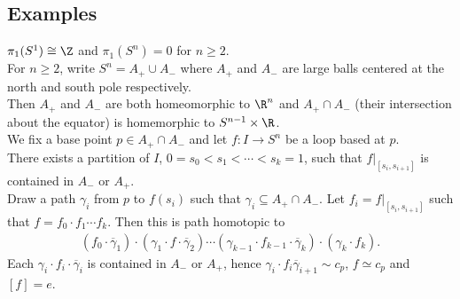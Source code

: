\documentclass[11pt]{article}
\begin{document}
\subsection*{Examples}
\label{sec:orgbe87c89}
\(\pi_{1}(S^{1})\cong\Z\) and \(\pi_{1}(S^{n})=0\) for \(n\geq2\).\\
For \(n\geq 2\), write \(S^{n}=A_{+}\cup A_{-}\) where \(A_{+}\) and \(A_{-}\) are large balls centered at the north and south pole respectively.\\
Then \(A_{+}\) and \(A_{-}\) are both homeomorphic to \(\R^{n}\) and \(A_{+}\cap A_{-}\) (their intersection about the equator) is homemorphic to \(S^{n-1}\times\R\).\\
We fix a base point \(p\in A_{+}\cap A_{-}\) and let \(f:I\to S^{n}\) be a loop based at \(p\).\\
There exists a partition of \(I\), \(0=s_{0}<s_{1}<\cdots<s_{k}=1\), such that \(f|_{[s_{i},s_{i+1}]}\) is contained in \(A_{-}\) or \(A_{+}\).\\
Draw a path \(\gamma_{i}\) from \(p\) to \(f(s_{i})\) such that \(\gamma_{i}\subseteq A_{+}\cap A_{-}\). Let \(f_{i}=f|_{[s_{i},s_{i+1}]}\) such that \(f=f_{0}\cdot f_{1}\cdots f_{k}\). Then this is path homotopic to\\
\begin{align*}
  (f_{0}\cdot\overline{\gamma}_{1})\cdot(\gamma_{1}\cdot f\cdot\overline{\gamma}_{2})\cdots(\gamma_{k-1}\cdot f_{k-1}\cdot\overline{\gamma}_{k})\cdot(\gamma_{k}\cdot f_{k}).
\end{align*}
Each \(\gamma_{i}\cdot f_{i}\cdot\overline{\gamma}_{i}\) is contained in \(A_{-}\) or \(A_{+}\), hence \(\gamma_{i}\cdot f_{i}\overline{\gamma}_{i+1}\sim c_{p}\), \(f\simeq c_{p}\) and \([f]=e\).\\
\end{document}

